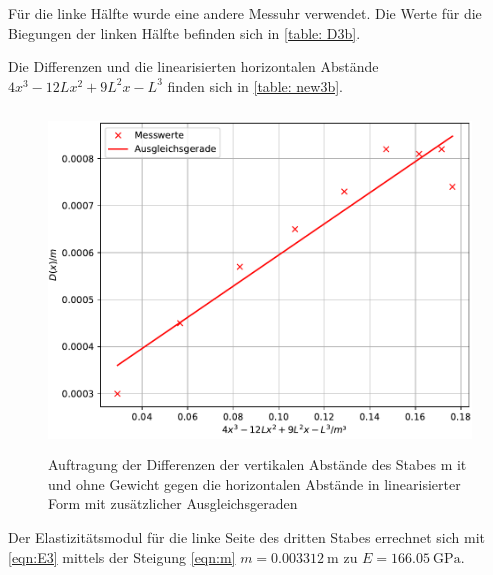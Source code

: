 Für die linke Hälfte wurde eine andere Messuhr verwendet.
Die Werte für die Biegungen der linken Hälfte befinden sich in \ref{table: D3b}.

Die Differenzen und die linearisierten horizontalen Abstände
$4x^3-12Lx^2+9L^2x-L^3$ finden sich in \ref{table: new3b}.

\begin{figure}
  \centering
  \includegraphics[width=12cm, height=9cm]{./plots/Stange3b.pdf}
  \caption{Auftragung der Differenzen der vertikalen Abstände des Stabes m      it und ohne Gewicht gegen die horizontalen Abstände in linearisierter Form       mit zusätzlicher Ausgleichsgeraden}
  \label{fig:plot3b}
\end{figure}
Der Elastizitätsmodul für die linke Seite des dritten Stabes
errechnet sich mit \eqref{eqn:E3}
mittels der Steigung \eqref{eqn:m}
$m =\SI{0.003312}{\meter}$ zu $E = \SI{166.05}{\giga\pascal}$.
